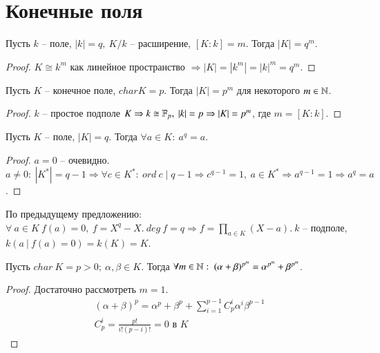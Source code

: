 \documentclass[main]{subfiles}
\begin{document}
\chapter{Конечные поля}

\begin{proposition}
    Пусть $k$ -- поле, $|k| = q, \ K/k$ -- расширение, $[K:k] = m$. Тогда $|K| = q^m$.
\end{proposition}

\begin{proof}
    $K \cong k^m$ как линейное пространство $\Rightarrow |K| = |k^m| = |k|^m = q^m$.
\end{proof}

\begin{corollary}
    Пусть $K$ -- конечное поле, $char K = p$. Тогда $|K| = p^m$ для некоторого $m \in \mathbb{N}$.
\end{corollary}

\begin{proof}
    $k$ -- простое подполе $K \Rightarrow k \cong \mathbb{F}_p, \ |k| = p \Rightarrow |K| = p^m$, где $m = [K:k]$. 
\end{proof}

\begin{proposition}
    Пусть $K$ -- поле, $|K| = q$. Тогда $\forall a \in K: \ a^q = a$.
\end{proposition}

\begin{proof}
    $a = 0$ -- очевидно. $a \neq 0: \ |K^*| = q - 1 \Rightarrow \forall c \in K^*: \ ord \ c \mid q - 1 \Rightarrow c^{q-1} = 1, \ a \in K^* \Rightarrow 
    a^{q-1} = 1 \Rightarrow a^q = a$.
\end{proof}

\begin{corollary}
    По предыдущему предложению: $\forall \ a \in K \ f(a) = 0, \ f = X^q - X. \ deg \ f = q \Rightarrow f = \prod_{a \in K}(X - a). \ k$ -- подполе, 
    $k(a \ | \ f(a) = 0) = k(K) = K$.
\end{corollary}

\begin{lemma}
    Пусть $char \ K = p > 0; \ \alpha, \beta \in K$. Тогда $\forall m \in \mathbb{N}: \ (\alpha + \beta)^{p^m} = \alpha^{p^m} + \beta^{p^m}$.
\end{lemma}

\begin{proof}
    Достаточно рассмотреть $m = 1$.
    \begin{gather*}
        (\alpha + \beta)^p = \alpha^p + \beta^p + \sum_{i = 1}^{p-1}C_p^i\alpha^i\beta^{p-1} \\
        C_p^i = \frac{p!}{i!(p-i)!} = 0 \text{ в } K
    \end{gather*}
\end{proof}
\end{document}
